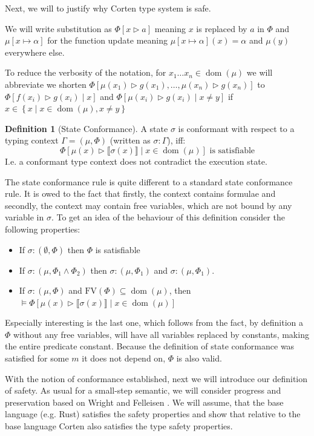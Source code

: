 \documentclass[twoside, english, final]{sdqthesis}
\newcommand{\set}[1]{\left\{ #1 \right\}}
\newcommand{\bbracket}[1]{\llbracket #1 \rrbracket}
\newcommand{\tr}[0]{\triangleright}
\DeclareMathOperator{\dom}{dom}
\theoremstyle{definition}
\newtheorem{definition}[theorem]{Definition}
\begin{document}
Next, we will to justify why Corten type system is safe.


We will write substitution as $\Phi[ x \tr a ]$ meaning $x$ is replaced by $a$ in $\Phi$ and $\mu[x \mapsto \alpha]$ for the function update meaning $\mu[x \mapsto \alpha](x) = \alpha$ and $\mu(y)$ everywhere else.

To reduce the verbosity of the notation, for $x_1 \dots x_n \in \dom(\mu)$ we will abbreviate
we shorten $\Phi[\mu(x_1) \tr g(x_1), \dots, \mu(x_n) \tr g(x_n)]$ to $\Phi[f(x_i) \tr g(x_i) \mid x]$ and $\Phi[\mu(x_i) \tr g(x_i) \mid x \neq y]$ if $x \in \set{ x \mid x \in \dom(\mu), x \neq y }$



\begin{definition}[State Conformance]\label{def:state-conformance}
  A state $\sigma$ is conformant with respect to a typing context $\Gamma = (\mu, \Phi)$ (written as $\sigma : \Gamma$), iff:
  $$
    \Phi[\mu(x) \triangleright \bbracket{\sigma(x)} \mid x \in \dom(\mu)] \text{ is satisfiable}
  $$
  I.e. a conformant type context does not contradict the execution state.
\end{definition}

The state conformance rule is quite different to a standard state conformance rule. It is owed to the fact that firstly, the context contains formulae and secondly, the context may contain free variables, which are not bound by any variable in $\sigma$.
To get an idea of the behaviour of this definition consider the following properties:
\begin{itemize}
  \item If $\sigma : (\emptyset, \Phi)$ then $\Phi$ is satisfiable
  \item If $\sigma : (\mu, \Phi_1 \wedge \Phi_2)$ then $\sigma : (\mu, \Phi_1)$ and $\sigma : (\mu, \Phi_1)$.
  \item If $\sigma : (\mu, \Phi)$ and $\text{FV}(\Phi) \subseteq \dom(\mu)$, then $\vDash \Phi[\mu(x) \triangleright \bbracket{\sigma(x)} \mid x \in \dom(\mu)]$
\end{itemize}

Especially interesting is the last one, which follows from the fact, by definition a $\Phi$ without any free variables, will have all variables replaced by constants, making the entire predicate constant. Because the definition of state conformance was satisfied for some $m$ it does not depend on, $\Phi$ is also valid.

With the notion of conformance established, next we will introduce our definition of safety.
As usual for a small-step semantic, we will consider progress and preservation based on Wright and Felleisen \cite{wright_syntactic_1994}. 
We will assume, that the base language (e.g. Rust) satisfies the safety properties and show that relative to the base language Corten also satisfies the type safety properties.
\end{document}
